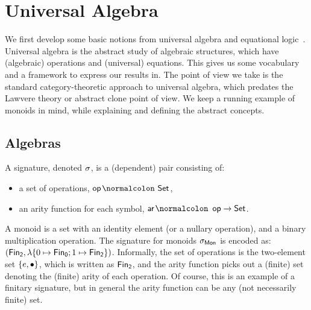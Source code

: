 
\section{Universal Algebra}
\label{sec:universal-algebra}

We first develop some basic notions from universal algebra and equational
logic~\cite{birkhoffStructureAbstractAlgebras1935}.
%
Universal algebra is the abstract study of algebraic structures, which have (algebraic) operations and (universal)
equations.
%
This gives us some vocabulary and a framework to express our results in.
%
The point of view we take is the standard category-theoretic approach to universal algebra, which predates the Lawvere
theory or abstract clone point of view.
%
We keep a running example of monoids in mind, while explaining and defining the abstract concepts.

\subsection{Algebras}
\label{sec:universal-algebra:algebras}

\begin{definition}[Signature]\label{algebra:signature}
    \label{def:signature}
    A signature, denoted $\sigma$, is a (dependent) pair consisting of:
    \begin{itemize}
        \item a set of operations, $\op\colon \Set$,
        \item an arity function for each symbol, $\ar\colon \op \to \Set$.
    \end{itemize}
\end{definition}

\begin{example}
    A monoid is a set with an identity element (or a nullary operation), and a binary multiplication operation.
    The signature for monoids $\sigma_{\mathsf{Mon}}$ is encoded as:
    $(\Fin[2],\lambda \{0 \mapsto \Fin[0] ; 1 \mapsto \Fin[2] \})$.
    Informally, the set of operations is the two-element set $\{e,\mathbin{\bullet}\}$, which is written as $\Fin[2]$,
    and the arity function picks out a (finite) set denoting the (finite) arity of each operation.
    Of course, this is an example of a finitary signature,
    but in general the arity function can be any (not necessarily finite) set.
\end{example}

